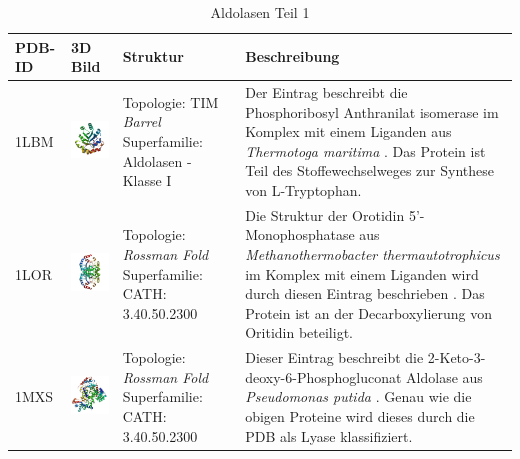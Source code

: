 \documentclass{article}
\begin{document}
\begin{table}
\begin{center}
\caption{Aldolasen Teil 1}
\begin{tabular}{ | C{9mm} | C{30mm} | C{29mm} | C{38mm} | }
\hline
PDB-ID & 3D Bild & Struktur & Beschreibung \\ \hline
1LBM  & \includegraphics[width=30mm, trim= -10 -5 -5 -10]{1LBM_bio_r_500.jpg} & Topologie: \newline TIM \textit{Barrel} \newline Superfamilie: Aldolasen - Klasse I & Der Eintrag beschreibt die Phosphoribosyl Anthranilat isomerase im Komplex mit einem Liganden aus \textit{Thermotoga maritima} \cite{1lbm}. Das Protein ist Teil des Stoffewechselweges zur Synthese von L-Tryptophan. \\ \hline
1LOR  & \includegraphics[width=30mm, trim= -10 -5 -5 -10]{1LOR_bio_r_500.jpg} & Topologie: \newline \textit{\textit{Rossman Fold}} \newline Superfamilie: CATH: 3.40.50.2300  & Die Struktur der Orotidin 5'-Monophosphatase aus \textit{Methanothermobacter thermautotrophicus} im Komplex mit einem Liganden wird durch diesen Eintrag beschrieben \cite{1lor}. Das Protein ist an der Decarboxylierung von Oritidin beteiligt. \\ \hline
1MXS  & \includegraphics[width=30mm, trim= -10 -5 -5 -10]{1MXS_bio_r_500.jpg} & Topologie: \newline \textit{\textit{Rossman Fold}} \newline Superfamilie: CATH: 3.40.50.2300  & Dieser Eintrag beschreibt die 2-Keto-3-deoxy-6-Phosphogluconat Aldolase aus \textit{Pseudomonas putida} \cite{1mxs}. Genau wie die obigen Proteine wird dieses durch die PDB als Lyase klassifiziert. \\ \hline

\end{tabular}
\end{center}
\end{table}
\end{document}
